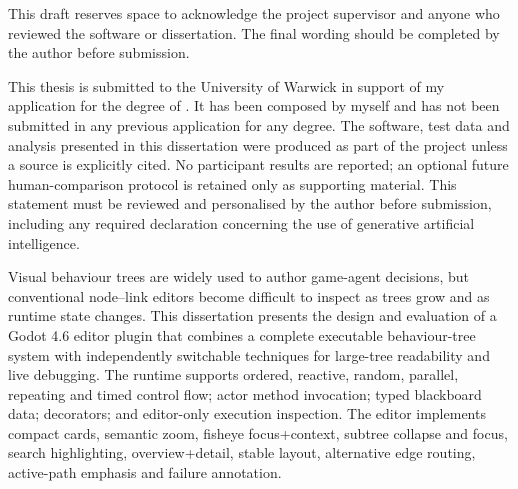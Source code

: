 \frontmatter
{}
\tableofcontents
\clearforchapter\listoffigures
\clearforchapter\listoftables

This draft reserves space to acknowledge the project supervisor and anyone who reviewed the software or dissertation. The final wording should be completed by the author before submission.

This thesis is submitted to the University of Warwick in support of my application for the degree of \thequalification. It has been composed by myself and has not been submitted in any previous application for any degree. The software, test data and analysis presented in this dissertation were produced as part of the project unless a source is explicitly cited. No participant results are reported; an optional future human-comparison protocol is retained only as supporting material. This statement must be reviewed and personalised by the author before submission, including any required declaration concerning the use of generative artificial intelligence.

Visual behaviour trees are widely used to author game-agent decisions, but conventional node--link editors become difficult to inspect as trees grow and as runtime state changes. This dissertation presents the design and evaluation of a Godot 4.6 editor plugin that combines a complete executable behaviour-tree system with independently switchable techniques for large-tree readability and live debugging. The runtime supports ordered, reactive, random, parallel, repeating and timed control flow; actor method invocation; typed blackboard data; decorators; and editor-only execution inspection. The editor implements compact cards, semantic zoom, fisheye focus+context, subtree collapse and focus, search highlighting, overview+detail, stable layout, alternative edge routing, active-path emphasis and failure annotation.

